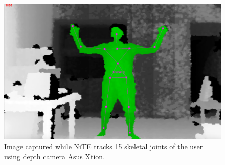 \begin{figure}
	[h] \centering 
	\includegraphics[width=145mm]{figures/content/ni-skeleton.jpg} \caption{Image captured while NiTE tracks 15 skeletal joints of the user using depth camera Asus Xtion. } \label{fg:ni:skeleton} 
\end{figure}